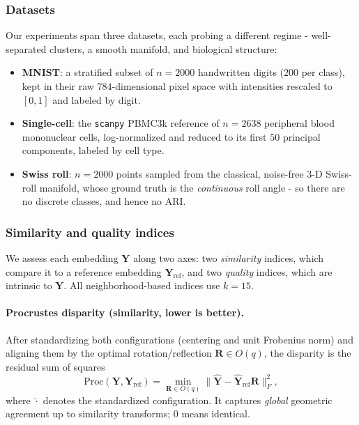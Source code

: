 \documentclass[11pt]{article}
\begin{document}
	\subsubsection{Datasets}
	\label{subsec:datasets}
	
	Our experiments span three datasets, each probing a different regime - well-separated
	clusters, a smooth manifold, and biological structure:
	\begin{itemize}
		\item \textbf{MNIST}: a stratified subset of $n=2000$ handwritten digits
		($200$ per class), kept in their raw $784$-dimensional pixel space with
		intensities rescaled to $[0,1]$ and labeled by digit.
		\item \textbf{Single-cell}: the \texttt{scanpy} PBMC3k reference of $n=2638$
		peripheral blood mononuclear cells, log-normalized and reduced to its first
		$50$ principal components, labeled by cell type.
		\item \textbf{Swiss roll}: $n=2000$ points sampled from the classical,
		noise-free $3$-D Swiss-roll manifold, whose ground truth is the
		\emph{continuous} roll angle - so there are no discrete classes, and hence no ARI.
	\end{itemize}
	
	\subsubsection{Similarity and quality indices}
	\label{subsec:indices}
	
	We assess each embedding $\mathbf{Y}$ along two axes: two \emph{similarity} indices,
	which compare it to a reference embedding $\mathbf{Y}_{\mathrm{ref}}$, and two
	\emph{quality} indices, which are intrinsic to $\mathbf{Y}$. All neighborhood-based
	indices use $k=15$.
	
	\paragraph{Procrustes disparity (similarity, lower is better).} After standardizing
	both configurations (centering and unit Frobenius norm) and aligning them by the
	optimal rotation/reflection $\mathbf{R}\in O(q)$, the disparity is the residual
	sum of squares
	\begin{equation}
		\mathrm{Proc}(\mathbf{Y},\mathbf{Y}_{\mathrm{ref}})
		= \min_{\mathbf{R}\in O(q)} \bigl\|\hat{\mathbf{Y}} - \hat{\mathbf{Y}}_{\mathrm{ref}}\mathbf{R}\bigr\|_F^2,
	\end{equation}
	where $\hat{\cdot}$ denotes the standardized configuration. It captures
	\emph{global} geometric agreement up to similarity transforms; $0$ means
	identical.
	
\end{document}
